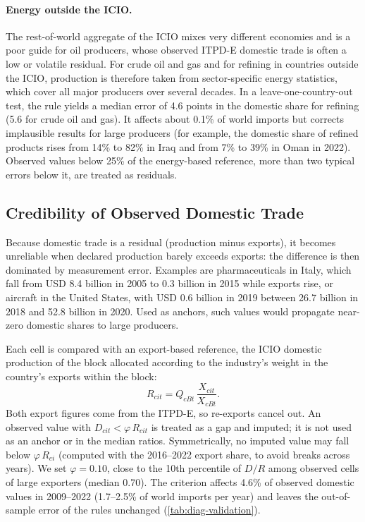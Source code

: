 \documentclass[final,1p,times,authoryear]{elsarticle}
\begin{document}
\paragraph{Energy outside the ICIO.} The rest-of-world aggregate of the ICIO mixes very different economies and is a poor guide for oil producers, whose observed ITPD-E domestic trade is often a low or volatile residual. For crude oil and gas and for refining in countries outside the ICIO, production is therefore taken from sector-specific energy statistics, which cover all major producers over several decades. In a leave-one-country-out test, the rule yields a median error of 4.6 points in the domestic share for refining (5.6 for crude oil and gas). It affects about 0.1\% of world imports but corrects implausible results for large producers (for example, the domestic share of refined products rises from 14\% to 82\% in Iraq and from 7\% to 39\% in Oman in 2022). Observed values below 25\% of the energy-based reference, more than two typical errors below it, are treated as residuals.

\subsection{Credibility of Observed Domestic Trade}\label{subsec:credibility}
Because domestic trade is a residual (production minus exports), it becomes unreliable when declared production barely exceeds exports: the difference is then dominated by measurement error. Examples are pharmaceuticals in Italy, which fall from USD 8.4 billion in 2005 to 0.3 billion in 2015 while exports rise, or aircraft in the United States, with USD 0.6 billion in 2019 between 26.7 billion in 2018 and 52.8 billion in 2020. Used as anchors, such values would propagate near-zero domestic shares to large producers.

Each cell is compared with an export-based reference, the ICIO domestic production of the block allocated according to the industry's weight in the country's exports within the block:
\begin{equation}
R_{cit} = Q_{cBt}\,\frac{X_{cit}}{X_{cBt}}.
\end{equation}
Both export figures come from the ITPD-E, so re-exports cancel out. An observed value with $D_{cit} < \varphi\, R_{cit}$ is treated as a gap and imputed; it is not used as an anchor or in the median ratios. Symmetrically, no imputed value may fall below $\varphi\, R_{ci}$ (computed with the 2016--2022 export share, to avoid breaks across years). We set $\varphi = 0.10$, close to the 10th percentile of $D/R$ among observed cells of large exporters (median 0.70). The criterion affects 4.6\% of observed domestic values in 2009--2022 (1.7--2.5\% of world imports per year) and leaves the out-of-sample error of the rules unchanged (\cref{tab:diag-validation}).
\end{document}
